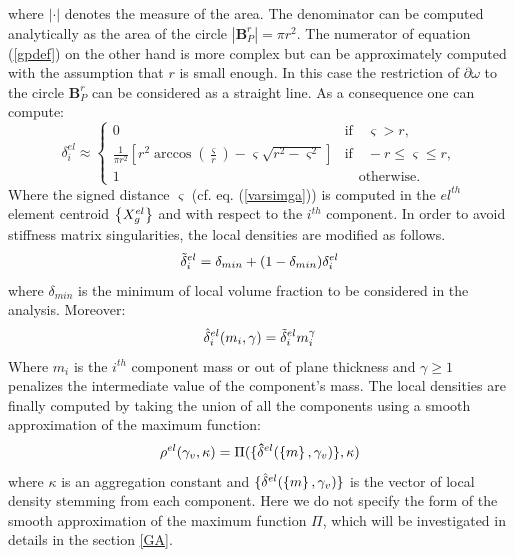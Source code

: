 where $|\cdot|$ denotes the measure of the area. The denominator can be computed analytically as the area of the circle  $|\mathbf{B}_P^r|=\pi r^2$. The numerator of equation (\ref{gpdef}) on the other hand is more complex but can be approximately computed with the assumption that $r$ is small enough. In this case the restriction of $\partial \omega$ to the circle $\mathbf{B}_P^r$ can be considered as a straight line. As a consequence one can compute:
\begin{equation}
\label{eq:dN}
    \delta^{el}_i\approx
    \begin{cases}
    0 & \text{if}\quad\varsigma>r,\\
    \frac{1}{\pi r^2}\left[r^2\arccos{\left(\frac{\varsigma}{r}\right)}-\varsigma\sqrt{r^2-\varsigma^2}\right]& \text{if} \quad-r\leq \varsigma\leq r,\\
    1 &\quad \text{otherwise}.
    \end{cases}
\end{equation}
Where the signed distance $\varsigma$ (cf. eq. (\ref{varsimga})) is computed in the $el^{th}$ element centroid $\left\{{X_g^{el}}\right\}$ and with respect to the $i^{th}$ component.
In order to avoid stiffness matrix singularities, the local densities are modified as follows.
\begin{equation}
    \Tilde{\delta}^{el}_i=\delta_{min}+(1-\delta_{min})\delta^{el}_i
\end{equation}
where $\delta_{min}$ is the minimum of local volume fraction to be considered in the analysis.
Moreover:
\begin{equation}
\label{eq:25}
    \hat{\delta}_i^{el}( m_i,\gamma )=\Tilde{\delta}^{el}_i m_i^\gamma  
\end{equation}
Where $m_i$ is the $i^{th}$ component mass or out of plane thickness \cite{norato2015geometry} and  $\gamma\geq1$ penalizes the intermediate value of the component's mass.
The local densities are finally computed by taking the union of all the components using a smooth approximation of the maximum function:
\begin{equation}
    \rho^{el}(\gamma_v ,\kappa)  =\Pi(\lbrace\mathbf{\hat{\delta}}^{el}(\left\{{m}\right\},\gamma_v )\rbrace,\kappa) 
\end{equation}
where $\kappa$ is an aggregation constant and $\lbrace\hat{\delta}^{el}(\left\{{m}\right\},\gamma_v )\rbrace$ is the vector of local density stemming from each component. Here we do not specify the form of the smooth approximation of the maximum function $\Pi$, which will be investigated in details in the section \ref{GA}. 
